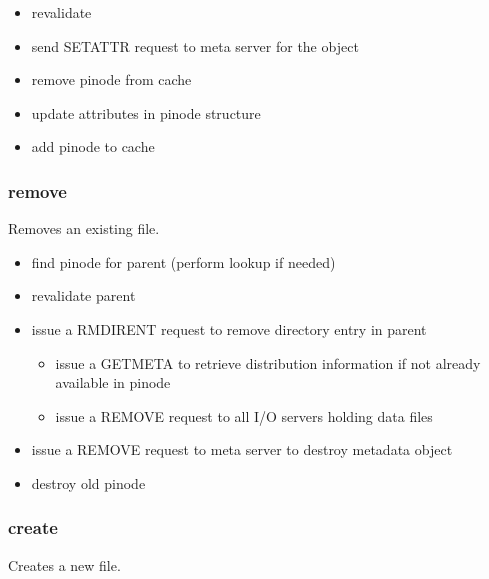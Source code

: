 \documentclass[11pt, letterpaper]{article}
\begin{document}
\begin{itemize}
\item revalidate
\item send SETATTR request to meta server for the object
\item remove pinode from cache
\item update attributes in pinode structure
\item add pinode to cache
\end{itemize}

\subsubsection{remove}

Removes an existing file.

\begin{itemize}
\item find pinode for parent (perform lookup if needed)
\item revalidate parent
\item issue a RMDIRENT request to remove directory entry in parent
\begin{itemize}
	\item issue a GETMETA to retrieve distribution information if not
	already available in pinode
	\item issue a REMOVE request to all I/O servers holding data files
\end{itemize}
\item issue a REMOVE request to meta server to destroy metadata object
\item destroy old pinode
\end{itemize}

\subsubsection{create}

Creates a new file.
\end{document}
